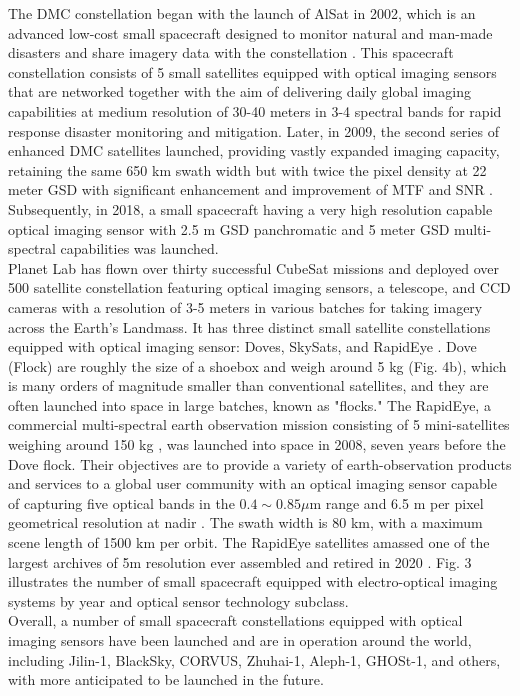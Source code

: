 \documentclass[final,5p,times,sort&compress,twocolumn]{elsarticle}
\begin{document}
The DMC constellation began with the launch of AlSat in 2002, which is an advanced low-cost small spacecraft designed to monitor natural and man-made disasters and share imagery data with the constellation \cite{surry2002}. This spacecraft constellation consists of 5 small satellites equipped with optical imaging sensors that are networked together with the aim of delivering daily global imaging capabilities at medium resolution of 30-40 meters in 3-4 spectral bands for rapid response disaster monitoring and mitigation.  Later, in 2009, the second series of enhanced DMC satellites launched, providing vastly expanded imaging capacity, retaining the same 650 km swath width but with twice the pixel density at 22 meter GSD with significant enhancement and improvement of MTF and SNR \cite{surry2002}.  Subsequently, in 2018, a small spacecraft having a very high resolution capable optical imaging sensor with 2.5 m GSD panchromatic and 5 meter GSD multi-spectral capabilities was launched.\\
Planet Lab has flown over thirty successful CubeSat missions and deployed over 500 satellite constellation featuring optical imaging sensors, a telescope, and CCD cameras \cite{gutierrez2021automated} with a resolution of 3-5 meters in various batches for taking imagery across the Earth's Landmass.   It has three distinct small satellite constellations equipped with optical imaging sensor: Doves, SkySats, and RapidEye \cite{planet2023}. Dove (Flock) are roughly the size of a shoebox and weigh around 5 kg (Fig. 4b), which is many orders of magnitude smaller than conventional satellites, and they are often launched into space in large batches, known as "flocks."  The RapidEye, a commercial multi-spectral earth observation mission consisting of 5 mini-satellites weighing around 150 kg \cite{sandau2010small}, was launched into space in 2008, seven years before the Dove flock. Their objectives are to provide a variety of earth-observation products and services to a global user community with an optical imaging sensor capable of capturing five optical bands in the $0.4 \sim 0.85 \mu$m range and 6.5 m per pixel geometrical resolution at nadir \cite{sandau2010small}. The swath width is 80 km, with a maximum scene length of 1500 km per orbit. The RapidEye satellites amassed one of the largest archives of 5m resolution ever assembled and retired in 2020 \cite{planet2023}. Fig. 3 illustrates the number of small spacecraft equipped with electro-optical imaging systems by year and optical sensor technology subclass.\\
 Overall, a number of small spacecraft constellations equipped with optical imaging sensors have been launched and are in operation around the world, including Jilin-1, BlackSky, CORVUS, Zhuhai-1, Aleph-1, GHOSt-1, and others, with more anticipated to be launched in the future. 
\end{document}

